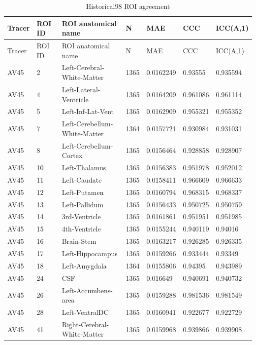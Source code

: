 \begin{landscape}
\begingroup
\footnotesize
\setlength{\tabcolsep}{4pt}
\begin{longtable}{lllllll}
\caption{Historical98 ROI agreement}\label{tab:s-n06}\\
\toprule
Tracer & ROI ID & ROI anatomical name & N & MAE & CCC & ICC(A,1) \\
\midrule
\endfirsthead
\toprule
Tracer & ROI ID & ROI anatomical name & N & MAE & CCC & ICC(A,1) \\
\midrule
\endhead
\bottomrule
\endfoot
AV45 & 2 & Left-Cerebral-White-Matter & 1365 & 0.0162249 & 0.93555 & 0.935594 \\
AV45 & 4 & Left-Lateral-Ventricle & 1365 & 0.0164209 & 0.961086 & 0.961114 \\
AV45 & 5 & Left-Inf-Lat-Vent & 1365 & 0.0162909 & 0.955321 & 0.955352 \\
AV45 & 7 & Left-Cerebellum-White-Matter & 1364 & 0.0157721 & 0.930984 & 0.931031 \\
AV45 & 8 & Left-Cerebellum-Cortex & 1365 & 0.0156464 & 0.928858 & 0.928907 \\
AV45 & 10 & Left-Thalamus & 1365 & 0.0156383 & 0.951978 & 0.952012 \\
AV45 & 11 & Left-Caudate & 1365 & 0.0158411 & 0.966609 & 0.966633 \\
AV45 & 12 & Left-Putamen & 1365 & 0.0160794 & 0.968315 & 0.968337 \\
AV45 & 13 & Left-Pallidum & 1365 & 0.0156433 & 0.950725 & 0.950759 \\
AV45 & 14 & 3rd-Ventricle & 1365 & 0.0161861 & 0.951951 & 0.951985 \\
AV45 & 15 & 4th-Ventricle & 1365 & 0.0155244 & 0.940119 & 0.94016 \\
AV45 & 16 & Brain-Stem & 1365 & 0.0163217 & 0.926285 & 0.926335 \\
AV45 & 17 & Left-Hippocampus & 1365 & 0.0159266 & 0.933444 & 0.93349 \\
AV45 & 18 & Left-Amygdala & 1364 & 0.0155806 & 0.94395 & 0.943989 \\
AV45 & 24 & CSF & 1365 & 0.016649 & 0.940691 & 0.940732 \\
AV45 & 26 & Left-Accumbens-area & 1365 & 0.0159288 & 0.981536 & 0.981549 \\
AV45 & 28 & Left-VentralDC & 1365 & 0.0160941 & 0.922677 & 0.922729 \\
AV45 & 41 & Right-Cerebral-White-Matter & 1365 & 0.0159968 & 0.939866 & 0.939908 \\

\end{longtable}
\end{landscape}
